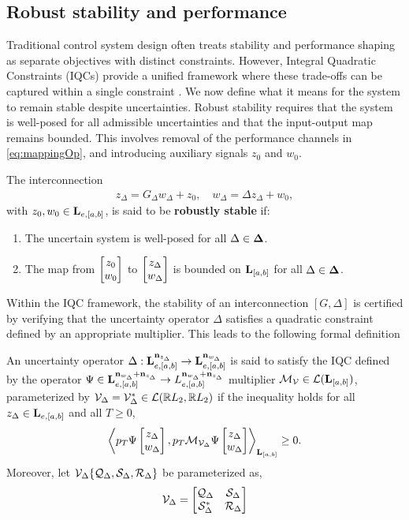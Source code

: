 \subsection{Robust stability and performance}
Traditional control system design often treats stability and performance shaping as separate objectives with distinct constraints. However, Integral Quadratic Constraints (IQCs) provide a unified framework where these trade-offs can be captured within a single constraint \cite{10156335}. We now define what it means for the system to remain stable despite uncertainties. Robust stability requires that the system is well-posed for all admissible uncertainties and that the input-output map remains bounded. This involves removal of the performance channels in \eqref{eq:mappingOp}, and introducing auxiliary signals $z_0$ and $w_0$.
\begin{definition}
	The interconnection
	\begin{align*}
		z_\Delta = G_\Delta w_\Delta + z_0, \quad
		w_\Delta = \Delta z_\Delta + w_0,
	\end{align*}
	with $z_0, w_0 \in \mathbf{L}_{e,[a,b]}$, is said to be \textbf{robustly stable} if:
	\begin{enumerate}
		\item The uncertain system is well-posed for all $\Delta\in\mathbf{\Delta}$.
		\item The map from $\begin{bmatrix}z_0\\w_0\end{bmatrix}$ to $\begin{bmatrix}z_\Delta\\w_\Delta\end{bmatrix}$ is bounded on $\mathbf{L}_{[a,b]}$ for all $\Delta\in\mathbf{\Delta}$.
	\end{enumerate}
\end{definition}
Within the IQC framework, the stability of an interconnection $[G,\Delta]$ is certified by verifying that the uncertainty operator $\Delta$ satisfies a quadratic constraint defined by an appropriate multiplier. This leads to the following formal definition
\begin{definition}\label{def:multipliers}
	An uncertainty operator $\Delta: \mathbf{L}_{e,[a,b]}^{\mathbf{n}_{z_\Delta}} \to \mathbf{L}_{e,[a,b]}^{\mathbf{n}_{w_\Delta}}$ is said to satisfy the IQC  defined by the operator $\Psi \in\mathbf{L}^{\mathbf{n}_{w_\Delta} + \mathbf{n}_{z_\Delta}}_{e, [a, b]} \to L^{\mathbf{n}_{w_\Delta} + \mathbf{n}_{z_\Delta}}_{e, [a, b]}$ multiplier $\mathcal{M}_{\mathcal{V}}\in \mathcal{L}(\mathbf{L}_{[a, b]})$, parameterized by $\mathcal{V}_\Delta = \mathcal{V}_\Delta^* \in \mathcal{L}(\mathbb{R} L_2, \mathbb{R} L_2)$ if the inequality holds for all $z_\Delta \in \mathbf{L}_{e, [a, b]}$ and all $T \geq 0$,
	\begin{equation}\label{eqn:unciqc}
		\left\langle p_T \Psi \begin{bmatrix}z_\Delta \\ w_\Delta\end{bmatrix}, p_T \mathcal{M}_{\mathcal{V}_\Delta}\Psi\begin{bmatrix}z_\Delta \\ w_\Delta\end{bmatrix} \right\rangle_{\mathbf{L}_{[a, b]}} \geq 0.
	\end{equation}
	Moreover, let $\mathcal{V}_\Delta\{\mathcal{Q}_\Delta, \mathcal{S}_\Delta, \mathcal{R}_\Delta\}$ be parameterized as,
	\begin{equation*}
		\mathcal{V}_\Delta = \begin{bmatrix}\mathcal{Q}_\Delta & \mathcal{S}_\Delta \\ \mathcal{S}_\Delta^* & \mathcal{R}_\Delta\end{bmatrix}
	\end{equation*}
\end{definition}
